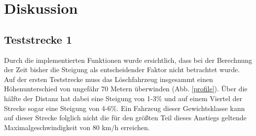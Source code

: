 \section{Diskussion}

\subsection{Teststrecke 1}

Durch die implementierten Funktionen wurde ersichtlich, dass bei der Berechnung der Zeit bisher die Steigung als entscheidender Faktor nicht betrachtet wurde.
Auf der ersten Teststrecke muss das Löschfahrzeug insgesammt einen Höhenunterschied von ungefähr 70 Metern überwinden (Abb. \ref{profile}).
Über die hälfte der Distanz hat dabei eine Steigung von 1-3$\%$ und auf einem Viertel der Strecke sogar eine Steigung von 4-6$\%$.
Ein Fahrzeug dieser Gewichtsklasse kann auf dieser Strecke folglich nicht die für den größten Teil dieses Anstiegs geltende Maximalgeschwindigkeit von 80 km/h erreichen.


